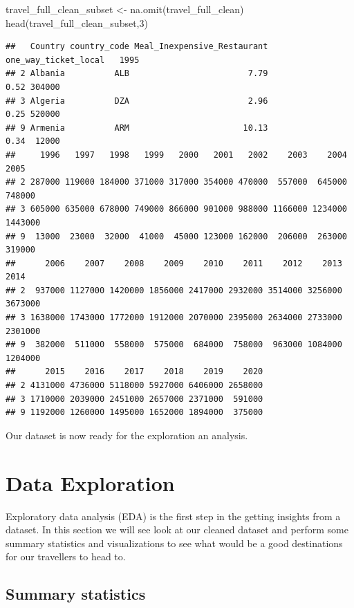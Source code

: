 \documentclass[
]{book}
\newenvironment{Shaded}{\begin{snugshade}}{\end{snugshade}}
\newcommand{\DecValTok}[1]{\textcolor[rgb]{0.00,0.00,0.81}{#1}}
\newcommand{\FunctionTok}[1]{\textcolor[rgb]{0.00,0.00,0.00}{#1}}
\newcommand{\NormalTok}[1]{#1}
\newcommand{\OtherTok}[1]{\textcolor[rgb]{0.56,0.35,0.01}{#1}}
\begin{document}
\begin{Shaded}
\begin{Highlighting}[]
\NormalTok{travel\_full\_clean\_subset }\OtherTok{\textless{}{-}} \FunctionTok{na.omit}\NormalTok{(travel\_full\_clean) }
\FunctionTok{head}\NormalTok{(travel\_full\_clean\_subset,}\DecValTok{3}\NormalTok{)}
\end{Highlighting}
\end{Shaded}

\begin{verbatim}
##   Country country_code Meal_Inexpensive_Restaurant one_way_ticket_local   1995
## 2 Albania          ALB                        7.79                 0.52 304000
## 3 Algeria          DZA                        2.96                 0.25 520000
## 9 Armenia          ARM                       10.13                 0.34  12000
##     1996   1997   1998   1999   2000   2001   2002    2003    2004    2005
## 2 287000 119000 184000 371000 317000 354000 470000  557000  645000  748000
## 3 605000 635000 678000 749000 866000 901000 988000 1166000 1234000 1443000
## 9  13000  23000  32000  41000  45000 123000 162000  206000  263000  319000
##      2006    2007    2008    2009    2010    2011    2012    2013    2014
## 2  937000 1127000 1420000 1856000 2417000 2932000 3514000 3256000 3673000
## 3 1638000 1743000 1772000 1912000 2070000 2395000 2634000 2733000 2301000
## 9  382000  511000  558000  575000  684000  758000  963000 1084000 1204000
##      2015    2016    2017    2018    2019    2020
## 2 4131000 4736000 5118000 5927000 6406000 2658000
## 3 1710000 2039000 2451000 2657000 2371000  591000
## 9 1192000 1260000 1495000 1652000 1894000  375000
\end{verbatim}

Our dataset is now ready for the exploration an analysis.

\hypertarget{data-exploration}{%
\chapter{Data Exploration}\label{data-exploration}}

Exploratory data analysis (EDA) is the first step in the getting insights from a dataset. In this section we will see look at our cleaned dataset and perform some summary statistics and visualizations to see what would be a good destinations for our travellers to head to.

\hypertarget{summary-statistics}{%
\section{Summary statistics}\label{summary-statistics}}
\end{document}
